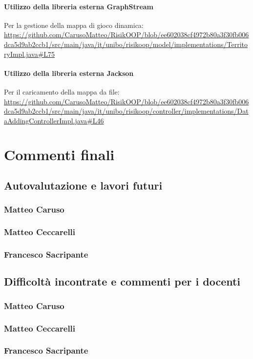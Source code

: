 \documentclass[a4paper,12pt]{report}
\begin{document}
\subsubsection{Utilizzo della libreria esterna GraphStream}
Per la gestione della mappa di gioco dinamica: \url{https://github.com/CarusoMatteo/RisikOOP/blob/ee602038cf4972b80a3f30fb006dca5d9ab2ccb1/src/main/java/it/unibo/risikoop/model/implementations/TerritoryImpl.java#L75}
\subsubsection{Utilizzo della libreria esterna Jackson}
Per il caricamento della mappa da file: \url{https://github.com/CarusoMatteo/RisikOOP/blob/ee602038cf4972b80a3f30fb006dca5d9ab2ccb1/src/main/java/it/unibo/risikoop/controller/implementations/DataAddingControllerImpl.java#L46}
\chapter{Commenti finali}

\section{Autovalutazione e lavori futuri}
\subsection{Matteo Caruso}
\subsection{Matteo Ceccarelli}
\subsection{Francesco Sacripante}

\section{Difficoltà incontrate e commenti per i docenti}
\subsection{Matteo Caruso}
\subsection{Matteo Ceccarelli}
\subsection{Francesco Sacripante}
\end{document}
